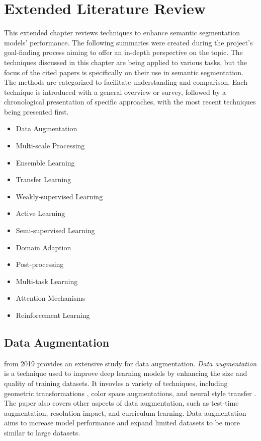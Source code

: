 \chapter{Extended Literature Review}
\label{chap:extended_literature_review}
This extended chapter reviews techniques to enhance semantic segmentation models' performance. The following summaries were created during the project's goal-finding process aiming to offer an in-depth perspective on the topic. The techniques discussed in this chapter are being applied to various tasks, but the focus of the cited papers is specifically on their use in semantic segmentation. The methods are categorized to facilitate understanding and comparison. Each technique is introduced with a general overview or survey, followed by a chronological presentation of specific approaches, with the most recent techniques being presented first.
\begin{itemize}[noitemsep]
    \item Data Augmentation
    \item Multi-scale Processing
    \item Ensemble Learning
    \item Transfer Learning
    \item Weakly-supervised Learning
    \item Active Learning
    \item Semi-supervised Learning
    \item Domain Adaption
    \item Post-processing
    \item Multi-task Learning
    \item Attention Mechanisms
    \item Reinforcement Learning
\end{itemize}
\section{Data Augmentation}
 \cite{shorten2019survey} from 2019 provides an extensive study for data augmentation. \textit{Data augmentation} is a technique used to improve deep learning models by enhancing the size and quality of training datasets. It invovles a variety of techniques, including geometric transformations \cite{taylor2018improving}, color space augmentations, and neural style transfer \cite{shorten2019survey}. The paper also covers other aspects of data augmentation, such as test-time augmentation, resolution impact, and curriculum learning. Data augmentation aims to increase model performance and expand limited datasets to be more similar to large datasets.

